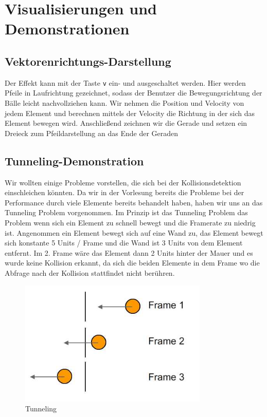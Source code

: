 \documentclass[12pt,a4paper]{article}
\begin{document}
	
	\section{Visualisierungen und Demonstrationen}
	
	
	\subsection{Vektorenrichtungs-Darstellung}
	
	Der Effekt kann mit der Taste \texttt{v} ein- und ausgeschaltet werden.  
	Hier werden Pfeile in Laufrichtung gezeichnet, sodass der Benutzer die Bewegungsrichtung der Bälle leicht nachvollziehen kann.  
	Wir nehmen die Position und Velocity von jedem Element und berechnen mittels der Velocity die Richtung in der sich das Element bewegen wird. Anschließend zeichnen wir die Gerade und setzen ein Dreieck zum Pfeildarstellung an das Ende der Geraden
		
	
	\subsection{Tunneling-Demonstration}
	
	Wir wollten einige Probleme vorstellen, die sich bei der Kollisionsdetektion einschleichen könnten.
	Da wir in der Vorlesung bereits die Probleme bei der Performance durch viele Elemente bereits behandelt haben, haben wir uns an das Tunneling Problem \cite{tunneling_source} vorgenommen.
	\newline
	Im Prinzip ist das Tunneling Problem das Problem wenn sich ein Element zu schnell bewegt und die Framerate zu niedrig ist. Angenommen ein Element bewegt sich auf eine Wand zu, das Element bewegt sich konstante 5 Units / Frame und die Wand ist 3 Units von dem Element entfernt. Im 2. Frame wäre das Element dann 2 Units hinter der Mauer und es wurde keine Kollision erkannt, da sich die beiden Elemente in dem Frame wo die Abfrage nach der Kollision stattfindet nicht berühren.
	
	\begin{figure}[H]
		\centering 
		\includegraphics[width=0.8\textwidth]{tunneling.jpg}  
		\caption{Tunneling  \cite{tunneling_example}} 
		\label{Bild: Beispiel Tunneling}  
	\end{figure}
	
\end{document}
